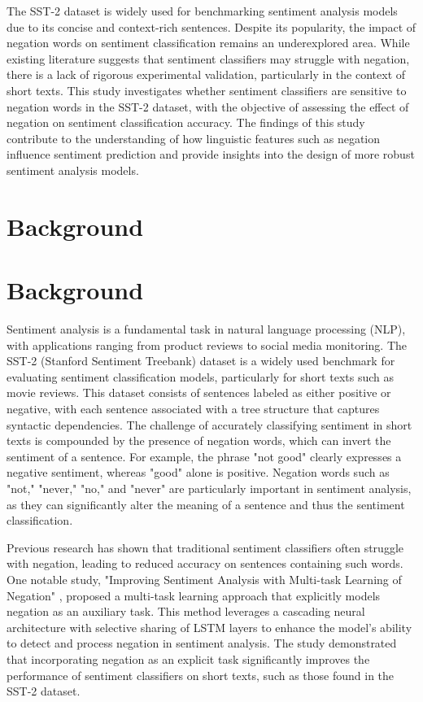 \documentclass{article}
\begin{document}
The SST-2 dataset is widely used for benchmarking sentiment analysis models due to its concise and context-rich sentences. Despite its popularity, the impact of negation words on sentiment classification remains an underexplored area. While existing literature suggests that sentiment classifiers may struggle with negation, there is a lack of rigorous experimental validation, particularly in the context of short texts. This study investigates whether sentiment classifiers are sensitive to negation words in the SST-2 dataset, with the objective of assessing the effect of negation on sentiment classification accuracy. The findings of this study contribute to the understanding of how linguistic features such as negation influence sentiment prediction and provide insights into the design of more robust sentiment analysis models.
\section{Background}
\section*{Background}

Sentiment analysis is a fundamental task in natural language processing (NLP), with applications ranging from product reviews to social media monitoring. The SST-2 (Stanford Sentiment Treebank) dataset is a widely used benchmark for evaluating sentiment classification models, particularly for short texts such as movie reviews. This dataset consists of sentences labeled as either positive or negative, with each sentence associated with a tree structure that captures syntactic dependencies. The challenge of accurately classifying sentiment in short texts is compounded by the presence of negation words, which can invert the sentiment of a sentence. For example, the phrase "not good" clearly expresses a negative sentiment, whereas "good" alone is positive. Negation words such as "not," "never," "no," and "never" are particularly important in sentiment analysis, as they can significantly alter the meaning of a sentence and thus the sentiment classification.

Previous research has shown that traditional sentiment classifiers often struggle with negation, leading to reduced accuracy on sentences containing such words. One notable study, "Improving Sentiment Analysis with Multi-task Learning of Negation" \cite{DBLP:journals/corr/abs-1906-07610}, proposed a multi-task learning approach that explicitly models negation as an auxiliary task. This method leverages a cascading neural architecture with selective sharing of LSTM layers to enhance the model's ability to detect and process negation in sentiment analysis. The study demonstrated that incorporating negation as an explicit task significantly improves the performance of sentiment classifiers on short texts, such as those found in the SST-2 dataset.
\end{document}
